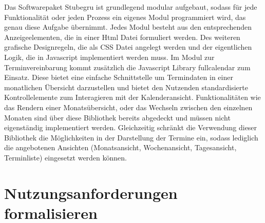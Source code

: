 Das Softwarepaket Stubegru ist grundlegend modular aufgebaut, sodass für jede
Funktionalität oder jeden Prozess ein eigenes Modul programmiert wird, das
genau diese Aufgabe übernimmt. Jedes Modul besteht aus den entsprechenden
Anzeigeelementen, die in einer Html Datei formuliert werden. Des weiteren
grafische Designregeln, die als CSS Datei angelegt werden und der eigentlichen
Logik, die in Javascript implementiert werden muss. Im Modul zur
Terminvereinbarung kommt zusätzlich die Javascript Library \gls{fullcalendar}
zum Einsatz. Diese bietet eine einfache Schnittstelle um Termindaten in einer
monatlichen Übersicht darzustellen und bietet den Nutzenden standardisierte
Kontrollelemente zum Interagieren mit der Kalenderansicht. Funktionalitäten wie
das Rendern einer Monatsübersicht, oder das Wechseln zwischen den einzelnen
Monaten sind über diese Bibliothek bereits abgedeckt und müssen nicht
eigenständig implementiert werden. Gleichzeitig schränkt die Verwendung dieser
Bibliothek die Möglichkeiten in der Darstellung der Termine ein, sodass
lediglich die angebotenen Ansichten (Monatsansicht, Wochenansicht,
Tagesansicht, Terminliste) eingesetzt werden können.

\section{Nutzungsanforderungen formalisieren}
\label{subsection:sequenceDiagrams}

